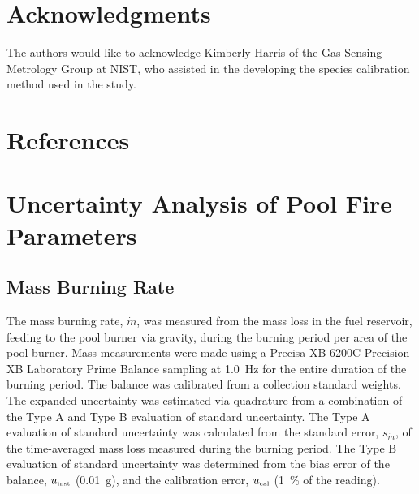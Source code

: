 \documentclass[12pt]{article}
\begin{document}
\section*{Acknowledgments}
\noindent The authors would like to acknowledge Kimberly Harris of the Gas Sensing Metrology Group at NIST, who assisted in the developing the species calibration method used in the study.
\pagebreak

\section*{References}


\pagebreak


\appendix
{}
\makeatletter
\newcommand{\section@cntformat}{Appendix:\ }
\makeatother

\section{Uncertainty Analysis of Pool Fire Parameters}\label{sec:Uncertainty_Pool_Fire_Parameters}

\subsection{Mass Burning Rate}
\label{ssec:Mass_Burning_Flux}
The mass burning rate, $\dot{m}$, was measured from the mass loss in the fuel reservoir, feeding to the pool burner via gravity, during the burning period per area of the pool burner. Mass measurements were made using a Precisa XB-6200C Precision XB Laboratory Prime Balance sampling at \SI{1.0}{\hertz} for the entire duration of the burning period. The balance was calibrated from a collection standard weights. The expanded uncertainty was estimated via quadrature from a combination of the Type A and Type B evaluation of standard uncertainty. The Type A evaluation of standard uncertainty was calculated from the standard error, $s_{\scriptscriptstyle \dot{m}}$, of the time-averaged mass loss measured during the burning period. The Type B evaluation of standard uncertainty was determined from the bias error of the balance, $u_{\rm \scriptscriptstyle inst}$ (\SI{0.01}{g}), and the calibration error, $u_{\rm \scriptscriptstyle cal}$ (1~\% of the reading).
\end{document}
